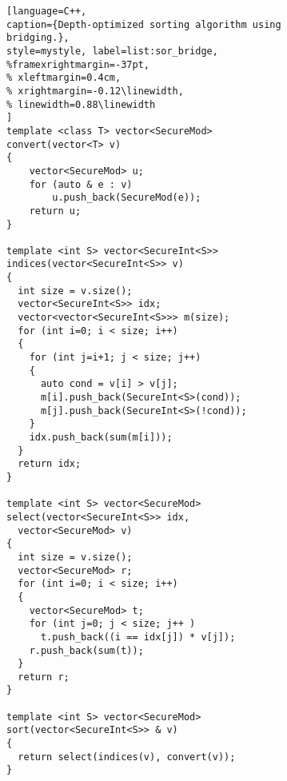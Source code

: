 \begin{figure}[t]
\begin{minipage}{\linewidth}
\begin{lstlisting}[language=C++,
caption={Depth-optimized sorting algorithm using bridging.},
style=mystyle, label=list:sor_bridge,
%framexrightmargin=-37pt,
% xleftmargin=0.4cm,
% xrightmargin=-0.12\linewidth,
% linewidth=0.88\linewidth
]
template <class T> vector<SecureMod>
convert(vector<T> v)
{
    vector<SecureMod> u;
    for (auto & e : v)
        u.push_back(SecureMod(e));
    return u;
}

template <int S> vector<SecureInt<S>>
indices(vector<SecureInt<S>> v)
{
  int size = v.size();
  vector<SecureInt<S>> idx;
  vector<vector<SecureInt<S>>> m(size);
  for (int i=0; i < size; i++)
  {
    for (int j=i+1; j < size; j++)
    {
      auto cond = v[i] > v[j];
      m[i].push_back(SecureInt<S>(cond));
      m[j].push_back(SecureInt<S>(!cond));
    }
    idx.push_back(sum(m[i]));
  }
  return idx;
}

template <int S> vector<SecureMod>
select(vector<SecureInt<S>> idx,
  vector<SecureMod> v)
{
  int size = v.size();
  vector<SecureMod> r;
  for (int i=0; i < size; i++)
  {
    vector<SecureMod> t;
    for (int j=0; j < size; j++ )
      t.push_back((i == idx[j]) * v[j]);
    r.push_back(sum(t));
  }
  return r;
}

template <int S> vector<SecureMod>
sort(vector<SecureInt<S>> & v)
{
  return select(indices(v), convert(v));
}


\end{lstlisting}
\end{minipage}
\end{figure}
